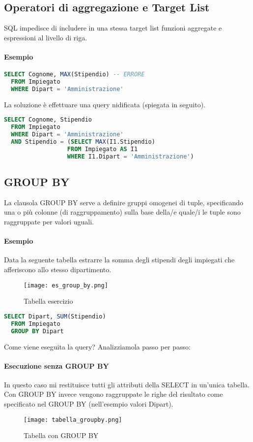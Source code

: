 \subsection{Operatori di aggregazione e Target List}
SQL impedisce di includere in una stessa target list funzioni aggregate e espressioni al livello
di riga.
\paragraph*{Esempio}
\begin{lstlisting}[language=SQL]
  SELECT Cognome, MAX(Stipendio) -- ERRORE
  FROM Impiegato
  WHERE Dipart = 'Amministrazione'
\end{lstlisting}
La soluzione è effettuare una query nidificata (spiegata in seguito).
\begin{lstlisting}[language=SQL]
  SELECT Cognome, Stipendio
  FROM Impiegato
  WHERE Dipart = 'Amministrazione'
  AND Stipendio = (SELECT MAX(I1.Stipendio) 
                  FROM Impiegato AS I1
                  WHERE I1.Dipart = 'Amministrazione')
\end{lstlisting}
\subsection{GROUP BY}
La clausola GROUP BY serve a definire gruppi omogenei di tuple, specificando una o
più colonne (di raggruppamento) sulla base della/e quale/i le tuple sono raggruppate
per valori uguali.\\
\paragraph*{Esempio}
Data la seguente tabella estrarre la somma degli stipendi degli impiegati che afferiscono
allo stesso dipartimento.
\begin{figure}[h]
  \centering
  \texttt{[image: es\_group\_by.png]}
  \caption{Tabella esercizio}
  \label{fig:tabella_es_groupby}
\end{figure}
\begin{lstlisting}[language=SQL]
  SELECT Dipart, SUM(Stipendio)
  FROM Impiegato
  GROUP BY Dipart
\end{lstlisting}
Come viene eseguita la query? Analizziamola passo per passo:
\paragraph*{Esecuzione senza GROUP BY}
In questo caso mi restituisce tutti gli attributi della SELECT in un'unica tabella.\\
Con GROUP BY invece vengono raggruppate le righe del risultato come specificato
nel GROUP BY (nell'esempio valori Dipart).
\begin{figure}[h]
  \centering
  \texttt{[image: tabella\_groupby.png]}
  \caption{Tabella con GROUP BY}
  \label{fig:tabella_groupby}
\end{figure}
